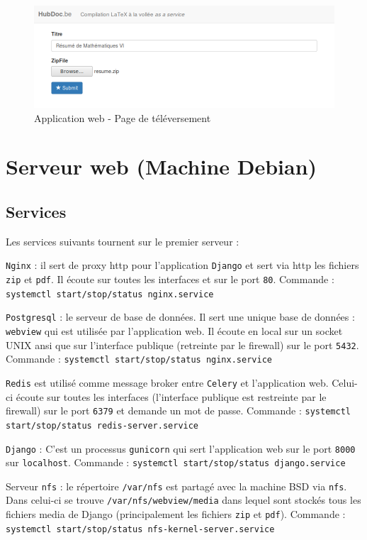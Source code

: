 \documentclass[10pt,a4paper]{article}
\begin{document}
\begin{figure}[!h]
   \includegraphics[scale=0.4]{hubdoc-upload.png}
   \caption{\label{app2} Application web - Page de téléversement}
\end{figure}

\section{Serveur web (Machine Debian)}
\subsection{Services}
Les services suivants tournent sur le premier serveur :

\texttt{Nginx} : il sert de proxy http pour l'application \texttt{Django} et sert via http les fichiers \texttt{zip} et \texttt{pdf}.
Il écoute sur toutes les interfaces et sur le port \texttt{80}.
Commande : \texttt{systemctl start/stop/status nginx.service}

\texttt{Postgresql} : le serveur de base de données.
Il sert une unique base de données : \texttt{webview} qui est utilisée par l'application web.
Il écoute en local sur un socket UNIX ansi que sur l'interface publique (retreinte par le firewall) sur le port \texttt{5432}.
Commande : \texttt{systemctl start/stop/status nginx.service}

\texttt{Redis} est utilisé comme message broker entre \texttt{Celery} et l'application web.
Celui-ci écoute sur toutes les interfaces (l'interface publique est restreinte par le firewall) sur le port \texttt{6379} et demande un mot de passe.
Commande : \texttt{systemctl start/stop/status redis-server.service}

\texttt{Django} : C'est un processus \texttt{gunicorn} qui sert l'application web sur le port \texttt{8000} sur \texttt{localhost}.
Commande : \texttt{systemctl start/stop/status django.service}

Serveur \texttt{nfs} : le répertoire \texttt{/var/nfs} est partagé avec la machine BSD via \texttt{nfs}.
Dans celui-ci se trouve \texttt{/var/nfs/webview/media} dans lequel sont stockés tous les fichiers media de Django (principalement les fichiers \texttt{zip} et \texttt{pdf}).
Commande : \texttt{systemctl start/stop/status nfs-kernel-server.service}
\end{document}
